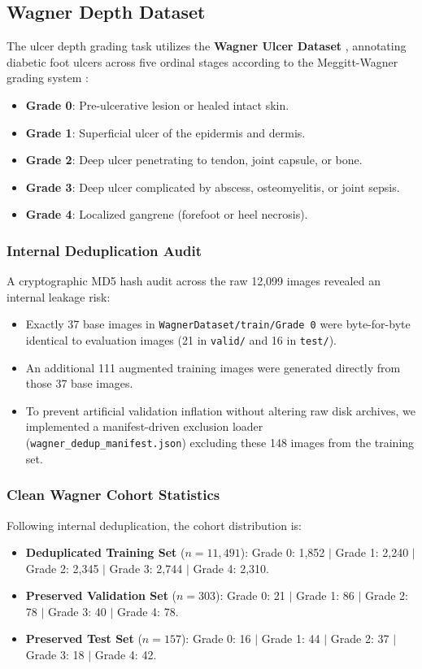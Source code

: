 \documentclass[journal]{IEEEtran}
\begin{document}
\subsection{Wagner Depth Dataset}
The ulcer depth grading task utilizes the \textbf{Wagner Ulcer Dataset} \cite{rostami2024deep, zhou2025deep}, annotating diabetic foot ulcers across five ordinal stages according to the Meggitt-Wagner grading system \cite{wagner1981dysvascular}:
\begin{itemize}
    \item \textbf{Grade 0}: Pre-ulcerative lesion or healed intact skin.
    \item \textbf{Grade 1}: Superficial ulcer of the epidermis and dermis.
    \item \textbf{Grade 2}: Deep ulcer penetrating to tendon, joint capsule, or bone.
    \item \textbf{Grade 3}: Deep ulcer complicated by abscess, osteomyelitis, or joint sepsis.
    \item \textbf{Grade 4}: Localized gangrene (forefoot or heel necrosis).
\end{itemize}

\subsubsection{Internal Deduplication Audit}
A cryptographic MD5 hash audit across the raw 12,099 images revealed an internal leakage risk:
\begin{itemize}
    \item Exactly 37 base images in \texttt{WagnerDataset/train/Grade 0} were byte-for-byte identical to evaluation images (21 in \texttt{valid/} and 16 in \texttt{test/}).
    \item An additional 111 augmented training images were generated directly from those 37 base images.
    \item To prevent artificial validation inflation without altering raw disk archives, we implemented a manifest-driven exclusion loader (\texttt{wagner\_dedup\_manifest.json}) excluding these 148 images from the training set.
\end{itemize}

\subsubsection{Clean Wagner Cohort Statistics}
Following internal deduplication, the cohort distribution is:
\begin{itemize}
    \item \textbf{Deduplicated Training Set} ($n = 11,491$): Grade 0: 1,852 $|$ Grade 1: 2,240 $|$ Grade 2: 2,345 $|$ Grade 3: 2,744 $|$ Grade 4: 2,310.
    \item \textbf{Preserved Validation Set} ($n = 303$): Grade 0: 21 $|$ Grade 1: 86 $|$ Grade 2: 78 $|$ Grade 3: 40 $|$ Grade 4: 78.
    \item \textbf{Preserved Test Set} ($n = 157$): Grade 0: 16 $|$ Grade 1: 44 $|$ Grade 2: 37 $|$ Grade 3: 18 $|$ Grade 4: 42.
\end{itemize}
\end{document}
